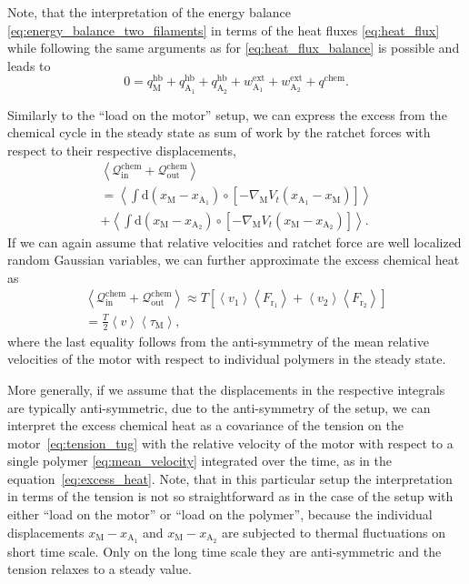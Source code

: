 \documentclass[aps,pre,twocolumn,showpacs,showkeys,superscriptaddress,floatfix]{revtex4-1}
\newcommand{\rmd}{{\mathrm d}}
\begin{document}
Note, that the interpretation of the energy balance \eqref{eq:energy_balance_two_filaments} in terms of the heat fluxes \eqref{eq:heat_flux}
while following the same arguments as for \eqref{eq:heat_flux_balance} is possible and leads to   
\[
0 = q_\text{M}^\text{hb} + q_{\text{A}_1}^\text{hb} + q_{\text{A}_2}^\text{hb} + w^\text{ext}_{\text{A}_1} + w^\text{ext}_{\text{A}_2} + q^\text{chem} .
\]

Similarly to the ``load on the motor'' setup, we can express the excess from the chemical cycle in the steady state as sum of work by the ratchet forces with respect to their respective displacements,
\begin{multline}
\left\langle 
{\mathcal Q}_\text{in}^\text{chem} + {\mathcal Q}_\text{out}^\text{chem} 
\right\rangle 
\\
= 
\left\langle 
\int \rmd \left( x_\text{M} - x_{\text{A}_1} \right) \circ \left[ - \nabla_\text{M} V_t( x_{\text{A}_1} - x_\text{M} ) \right]
\right\rangle 
\\
+
\left\langle 
\int \rmd \left( x_\text{M} - x_{\text{A}_2} \right) \circ \left[ - \nabla_\text{M} V_t( x_\text{M} - x_{\text{A}_2} ) \right]
\right\rangle .
\label{eq:excess_heat_tug}
\end{multline} 
If we can again assume that relative velocities and ratchet force are well localized random Gaussian variables, 
we can further approximate the excess chemical heat as 
\begin{multline*}
\left\langle 
{\mathcal Q}_\text{in}^\text{chem} + {\mathcal Q}_\text{out}^\text{chem} 
\right\rangle 
\approx T \left[ 
\left\langle v_1 \right\rangle \left\langle F_{\text{r}_1} \right\rangle  
+
\left\langle v_2 \right\rangle \left\langle F_{\text{r}_2} \right\rangle  
\right]
\\
= \frac{T}{2} \left\langle v \right\rangle \left\langle \tau_\text{M} \right\rangle
, 
\end{multline*}
where the last equality follows from the anti-symmetry of the mean relative velocities of the motor with respect to individual polymers in the steady state. 

More generally, if we assume that the displacements in the respective integrals are typically anti-symmetric, due to the anti-symmetry of the setup, 
we can interpret the excess chemical heat as a covariance of the tension on the motor~\eqref{eq:tension_tug} with the relative velocity of the motor with respect to a single polymer \eqref{eq:mean_velocity} integrated over the time, 
as in the equation~\eqref{eq:excess_heat}. 
Note, that in this particular setup the interpretation in terms of the tension is not so straightforward as in the case of the setup with either ``load on the motor'' or ``load on the polymer'', 
because the individual displacements $x_\text{M} - x_{\text{A}_1}$ and $x_\text{M} - x_{\text{A}_2}$ are subjected to thermal fluctuations on short time scale. 
Only on the long time scale they are anti-symmetric and the tension relaxes to a steady value.  
\end{document}
